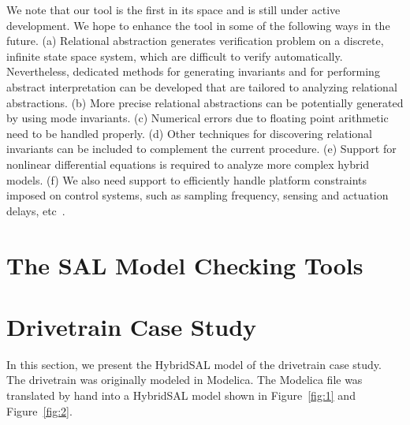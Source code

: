 \documentclass{llncs}
\begin{document}
We note that our tool is the first in its space and is still
under active development.  We hope to
enhance the tool in some of the following ways 
in the future. %
(a) Relational abstraction generates verification 
problem on a discrete, infinite state space system, which are difficult to
verify automatically.  
Nevertheless, dedicated methods for generating 
invariants and for performing abstract interpretation can be developed
that are tailored to analyzing relational abstractions.
(b) More precise relational abstractions can be potentially generated
by using mode invariants.
(c) Numerical errors due to floating point arithmetic need
to be handled properly.
(d) Other techniques for discovering relational
invariants can be included to complement the current procedure.
(e) Support for nonlinear differential equations is required to
analyze more complex hybrid models.
(f) We also need support to efficiently handle platform constraints
imposed on control systems, such as sampling frequency, 
sensing and actuation delays, etc~\cite{ZST12:CAV}.%


\section{The SAL Model Checking Tools}


\section{Drivetrain Case Study}

In this section, we present the HybridSAL model of the drivetrain case study.
The drivetrain was originally modeled in Modelica. 
The Modelica file was translated by hand into a HybridSAL model
shown in Figure~\ref{fig:1} and Figure~\ref{fig:2}.
\end{document}
